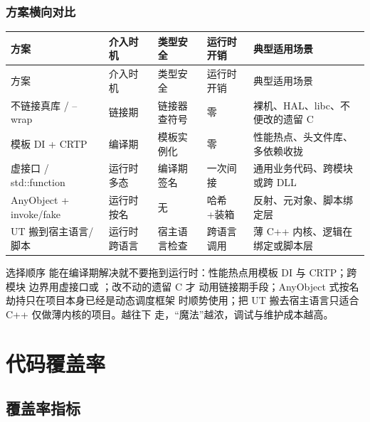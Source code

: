 \documentclass[12pt,a4paper,fontset=fandol]{ctexbook}
\begin{document}
\subsection{方案横向对比}

{
\scriptsize
\setlength{\tabcolsep}{3pt}
\begin{longtable}{>{\raggedright\arraybackslash}p{2.8cm}>{\raggedright\arraybackslash}p{1.9cm}>{\raggedright\arraybackslash}p{2.0cm}>{\raggedright\arraybackslash}p{1.8cm}>{\raggedright\arraybackslash}p{4.3cm}}
\toprule
方案 & 介入时机 & 类型安全 & 运行时开销 & 典型适用场景 \\
\midrule
\endfirsthead
\toprule
方案 & 介入时机 & 类型安全 & 运行时开销 & 典型适用场景 \\
\midrule
\endhead
不链接真库 / --wrap   & 链接期       & 链接器查符号 & 零        & 裸机、HAL、libc、不便改的遗留 C \\
模板 DI + CRTP        & 编译期       & 模板实例化   & 零        & 性能热点、头文件库、多依赖收拢 \\
虚接口 / std::function & 运行时多态  & 编译期签名   & 一次间接  & 通用业务代码、跨模块或跨 DLL \\
AnyObject + invoke/fake & 运行时按名 & 无           & 哈希+装箱 & 反射、元对象、脚本绑定层 \\
UT 搬到宿主语言/脚本  & 运行时跨语言 & 宿主语言检查 & 跨语言调用 & 薄 C++ 内核、逻辑在绑定或脚本层 \\
\bottomrule
\end{longtable}
}

\begin{guideline}{选择顺序}
能在编译期解决就不要拖到运行时：性能热点用模板 DI 与 CRTP；跨模块
边界用虚接口或 ；改不动的遗留 C 才
动用链接期手段；AnyObject 式按名劫持只在项目本身已经是动态调度框架
时顺势使用；把 UT 搬去宿主语言只适合 C++ 仅做薄内核的项目。越往下
走，“魔法”越浓，调试与维护成本越高。
\end{guideline}

\chapter{代码覆盖率}

\section{覆盖率指标}
\end{document}

